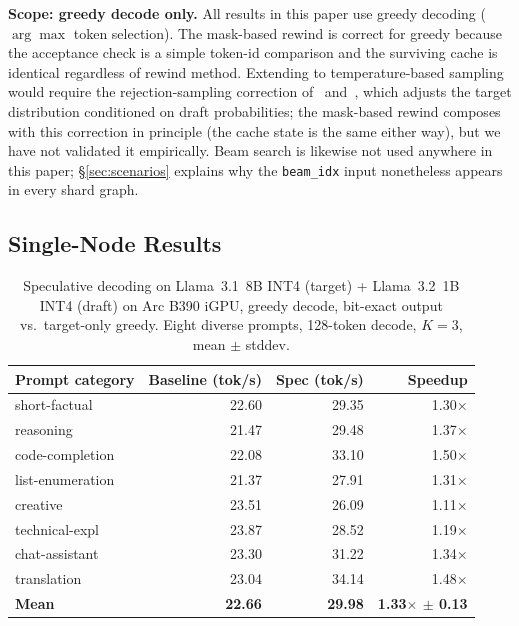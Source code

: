 \documentclass[11pt]{article}
\begin{document}
\textbf{Scope: greedy decode only.} All results in this paper use greedy decoding ($\arg\max$ token selection). The mask-based rewind is correct for greedy because the acceptance check is a simple token-id comparison and the surviving cache is identical regardless of rewind method. Extending to temperature-based sampling would require the rejection-sampling correction of~\citet{leviathan2023fast} and~\citet{chen2023accelerating}, which adjusts the target distribution conditioned on draft probabilities; the mask-based rewind composes with this correction in principle (the cache state is the same either way), but we have not validated it empirically. Beam search is likewise not used anywhere in this paper; \S\ref{sec:scenarios} explains why the \texttt{beam\_idx} input nonetheless appears in every shard graph.

\subsection{Single-Node Results}

\begin{table}[ht]
\centering
\caption{Speculative decoding on Llama~3.1~8B INT4 (target) + Llama~3.2~1B INT4 (draft) on Arc B390 iGPU, greedy decode, bit-exact output vs.\ target-only greedy. Eight diverse prompts, 128-token decode, $K\!=\!3$, mean $\pm$ stddev.}
\label{tab:spec_lan}
\begin{tabular}{@{}lrrr@{}}
\toprule
Prompt category & Baseline (tok/s) & Spec (tok/s) & Speedup \\
\midrule
short-factual    & 22.60 & 29.35 & 1.30$\times$ \\
reasoning        & 21.47 & 29.48 & 1.37$\times$ \\
code-completion  & 22.08 & 33.10 & 1.50$\times$ \\
list-enumeration & 21.37 & 27.91 & 1.31$\times$ \\
creative         & 23.51 & 26.09 & 1.11$\times$ \\
technical-expl   & 23.87 & 28.52 & 1.19$\times$ \\
chat-assistant   & 23.30 & 31.22 & 1.34$\times$ \\
translation      & 23.04 & 34.14 & 1.48$\times$ \\
\midrule
\textbf{Mean}    & \textbf{22.66} & \textbf{29.98} & \textbf{1.33$\times$ $\pm$ 0.13} \\
\bottomrule
\end{tabular}
\end{table}
\end{document}
